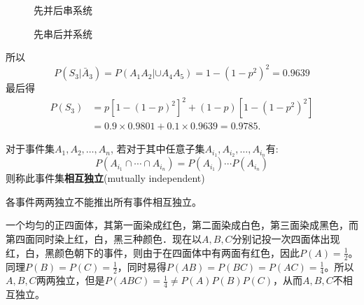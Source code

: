 \begin{solution}
\begin{figure}[!ht]
\begin{minipage}{0.48\linewidth}
            \caption{先并后串系统\label{fig1.5.1}}
        \end{minipage}
        \begin{minipage}{0.48\linewidth}
            \centering
            \caption{先串后并系统\label{fig1.5.2}}
        \end{minipage}
    \end{figure}
    所以
    \[ P(S_3|\bar A_3) = P(A_1A_2|\cup A_4A_5) = 1 - (1-p^2)^2 = 0.9639 \]
    最后得
    \begin{align*}
        P(S_3) & = p [ 1-(1-p)^2 ]^2 + (1-p)[ 1-(1-p^2)^2 ]       \\
               & = 0.9\times 0.9801 + 0.1 \times 0.9639 = 0.9785.
    \end{align*}
\end{solution}

\begin{definition}[相互独立]
    对于事件集$A_1, A_2, \dotsc, A_n$, 若对于其中任意子集$A_{i_1}, A_{i_2}, \dotsc, A_{i_n}$有:
    \[ P(A_{i_1} \cap \cdots  \cap A_{i_n}) =P(A_{i_1})\cdots P(A_{i_n})  \]
    则称此事件集\textbf{相互独立}(mutually independent)
\end{definition}
\begin{remark}
    各事件两两独立不能推出所有事件相互独立。
\end{remark}

\begin{example}[伯恩斯坦反例]
    一个均匀的正四面体，其第一面染成红色，第二面染成白色，第三面染成黑色，而第四面同时染上红，白，黑三种颜色．现在以$A,B,C$分别记投一次四面体出现红，白，黑颜色朝下的事件，则由于在四面体中有两面有红色，因此$P(A)=\frac{1}{2}$。同理$P(B)=P(C)=\frac{1}{2}$，同时易得$P(AB) = P(BC)= P(AC) =\frac{1}{4}$。所以$A,B,C$两两独立，但是$P(ABC)=\frac{1}{4}\neq P(A)P(B)P(C)$，从而$A,B,C$不相互独立。
\end{example}

